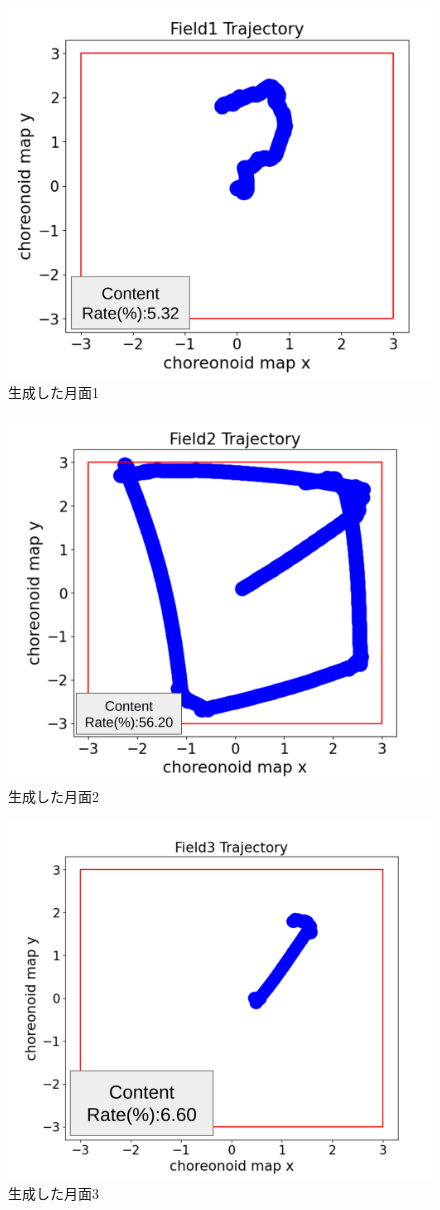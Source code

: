 \begin{figure}[htbp]
  \begin{center}
   \includegraphics[width=0.6\linewidth]{images/field1_trajectry.png}
   \caption{生成した月面1}
   \label{fig:field1_trajectry}
  \end{center}
 \end{figure}
 \begin{figure}[htbp]
  \begin{center}
   \includegraphics[width=0.6\linewidth]{images/field2_trajectry.png}
   \caption{生成した月面2}
   \label{fig:field2_trajectry}
  \end{center}
 \end{figure}
 \begin{figure}[htbp]
  \begin{center}
   \includegraphics[width=0.6\linewidth]{images/generate_trajectory3.png}
   \caption{生成した月面3}
   \label{fig:generate_trajectory3}
  \end{center}
 \end{figure}
